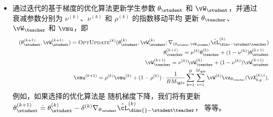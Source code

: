 \documentclass[../../book-main_zh.tex]{subfiles}
\begin{document}
\begin{itemize}
        \(\hat{\cL}_{\dino-\student\teacher}^{(k)}\)，定义如下：
        \begin{align}\label{eq:dino_loss_teacherstudent_empirical}
            &\hat{\cL}_{\dino{}-\student\teacher}^{(k)}(\theta_{\student},
            \theta_{\teacher}, \vW_{\student}, \vW_{\teacher}, \vmu) \doteq
            \frac{1}{BM_{\glo}(M_{\glo} + M_{\loc} - 1)}\sum_{b =
            1}^{B}\sum_{i = 1}^{M_{\glo}}\\
            &\Bigg[\sum_{j =
                1}^{M_{\loc}}d_{\CE}(\vp_{\theta_{\teacher},
                    \vW_{\teacher}, \vmu}(\vX_{b, g}^{(k), i}),
                    \vp_{\theta_{\student}, \vW_{\student}}(\vX_{b,
                \ell}^{(k), j})) + \sum_{\substack{j = 1 \\ j \neq
                i}}^{M_{\glo}}d_{\CE}(\vp_{\theta_{\teacher},
                    \vW_{\teacher}, \vmu}(\vX_{b, g}^{(k), i}),
                    \vp_{\theta_{\student}, \vW_{\student}}(\vX_{b, g}^{(k),
            j}))\Bigg]\nonumber
        \end{align}
        以及它相对于
        \(\theta_{\student}\) 和 \(\vW_{\student}\) 的梯度，这应该
        在假设 \(\theta_{\teacher}\)、
        \(\vW_{\teacher}\) 和 \(\vmu\) 是常数的情况下计算——即
        它们\textit{从计算图中分离出来}
        并且不依赖于 \(\theta_{\student}\) 和 \(\vW_{\student}\)。
    \item 通过迭代的基于梯度的优化算法更新学生参数 \(\theta_{\student}\) 和
        \(\vW_{\student}\)，并通过衰减参数分别为
        \(\nu^{(k)}\)、\(\nu^{(k)}\) 和 \(\rho^{(k)}\) 的指数移动平均
        更新 \(\theta_{\teacher}\)、
        \(\vW_{\teacher}\) 和 \(\vmu\)，即
        \begin{eqnarray}
            &&(\theta_{\student}^{(k + 1)}, \vW_{\student}^{(k + 1)})
            = \textsc{OptUpdate}^{(k)}(\theta_{\student}^{(k)},
                \vW_{\student}^{(k)}; \nabla_{(\theta_{\student},
            \vW_{\student})}\hat{\cL}_{\dino-\student\teacher}^{(k)}) \\
            &&\theta_{\teacher}^{(k + 1)}
            = \nu^{(k)}\theta_{\teacher}^{(k)} + (1 -
            \nu^{(k)})\theta_{\student}^{(k + 1)} \\
            &&\vW_{\teacher}^{(k + 1)}
            = \nu^{(k)}\vW_{\teacher}^{(k)} + (1 -
            \nu^{(k)})\vW_{\student}^{(k + 1)} \\
            &&\vmu^{(k + 1)}
            = \rho^{(k)}\vmu^{(k)} + (1 -
            \rho^{(k)})\cdot\frac{1}{BM_{\glo}}\sum_{b =
            1}^{B}\sum_{i =
            1}^{M_{\glo}}\vW^{(k)}\vz_{\theta_{\teacher}}(\vX_{b, g}^{(k), i}),
        \end{eqnarray}
        例如，如果选择的优化算法是
        随机梯度下降，我们将有更新
        \(\theta_{\student}^{(k + 1)} \doteq \theta_{\student}^{(k)}
            -
        \delta^{(k)}\nabla_{\theta_{\student}}\hat{\cL}_{\dino{}-\student\teacher}^{(k)}\)，
        等等。
\end{itemize}
\end{document}
